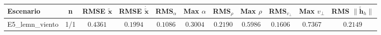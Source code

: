\begin{tabular}{lcccccccccc}
\toprule
Escenario & n & RMSE $\tilde{\mathbf{x}}$ & RMSE $\dot{\tilde{\mathbf{x}}}$ & RMS$_\alpha$ & Max $\alpha$ & RMS$_\rho$ & Max $\rho$ & RMS$_{v_\perp}$ & Max $v_\perp$ & RMS $\|\tilde{\mathbf{h}}_h\|$ \\
\midrule
E5\_lemn\_viento & 1/1 & $0.4361$ & $0.1994$ & $0.1086$ & $0.3004$ & $0.2190$ & $0.5986$ & $0.1606$ & $0.7367$ & $0.2149$ \\
\bottomrule
\end{tabular}
